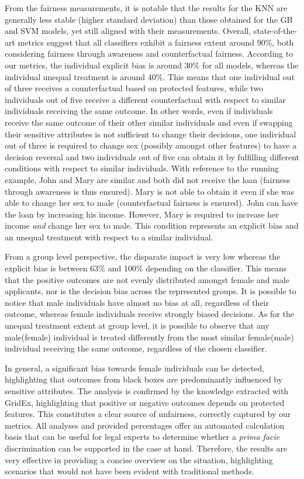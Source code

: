 \documentclass[letterpaper]{article} %
\begin{document}
From the fairness measurements, it is notable that the results for the KNN are generally less stable (higher standard deviation) than those obtained for the GB and SVM models, yet still aligned with their measurements.
%
Overall, state-of-the-art metrics suggest that all classifiers exhibit a fairness extent around 90\%, both considering fairness through awareness and counterfactual fairness.
%
According to our metrics, the individual explicit bias is around 30\% for all models, whereas the individual unequal treatment is around 40\%.
%
This means that one individual out of three receives a counterfactual based on protected features, while two individuals out of five receive a different counterfactual with respect to similar individuals receiving the same outcome.
%
In other words, even if individuals receive the same outcome of their other similar individuals and even if swapping their sensitive attributes is not sufficient to change their decisions, one individual out of three is required to change sex (possibly amongst other features) to have a decision reversal and two individuals out of five can obtain it by fulfilling different conditions with respect to similar individuals.
%
With reference to the running example, John and Mary are similar and both did not receive the loan (fairness through awareness is thus ensured). Mary is not able to obtain it even if she was able to change her sex to male (counterfactual fairness is ensured). John can have the loan by increasing his income. However, Mary is required to increase her income \emph{and} change her sex to male. This condition represents an explicit bias and an unequal treatment with respect to a similar individual.

From a group level perspective, the disparate impact is very low whereas the explicit bias is between 63\% and 100\% depending on the classifier.
%
This means that the positive outcomes are not evenly distributed amongst female and male applicants, nor is the decision bias across the represented groups.
%
It is possible to notice that male individuals have almost no bias at all, regardless of their outcome, whereas female individuals receive strongly biased decisions.
%
As for the unequal treatment extent at group level, it is possible to observe that any male(female) individual is treated differently from the most similar female(male) individual receiving the same outcome, regardless of the chosen classifier.

In general, a significant bias towards female individuals can be detected, highlighting that outcomes from black boxes are predominantly influenced by sensitive attributes.
The analysis is confirmed by the knowledge extracted with GridEx, highlighting that positive or negative outcomes depends on protected features. This constitutes a clear source of unfairness, correctly captured by our metrics.
%
All analyses and provided percentages offer an automated calculation basis that can be useful for legal experts to determine whether a \emph{prima facie} discrimination can be supported in the case at hand. Therefore, the results are very effective in providing a concise overview on the situation, highlighting scenarios that would not have been evident with traditional methods.
\end{document}
